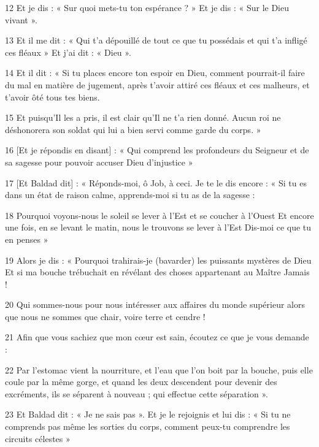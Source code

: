 \par 12 Et je dis : « Sur quoi mets-tu ton espérance ? » Et je dis : « Sur le Dieu vivant ».

\par 13 Et il me dit : « Qui t'a dépouillé de tout ce que tu possédais et qui t'a infligé ces fléaux » Et j'ai dit : « Dieu ».

\par 14 Et il dit : « Si tu places encore ton espoir en Dieu, comment pourrait-il faire du mal en matière de jugement, après t'avoir attiré ces fléaux et ces malheurs, et t'avoir ôté tous tes biens.

\par 15 Et puisqu'Il les a pris, il est clair qu'Il ne t'a rien donné. Aucun roi ne déshonorera son soldat qui lui a bien servi comme garde du corps. »

\par 16 [Et je répondis en disant] : « Qui comprend les profondeurs du Seigneur et de sa sagesse pour pouvoir accuser Dieu d'injustice »

\par 17 [Et Baldad dit] : « Réponds-moi, ô Job, à ceci. Je te le dis encore : « Si tu es dans un état de raison calme, apprends-moi si tu as de la sagesse :

\par 18 Pourquoi voyons-nous le soleil se lever à l'Est et se coucher à l'Ouest Et encore une fois, en se levant le matin, nous le trouvons se lever à l'Est Dis-moi ce que tu en penses »

\par 19 Alors je dis : « Pourquoi trahirais-je (bavarder) les puissants mystères de Dieu Et si ma bouche trébuchait en révélant des choses appartenant au Maître Jamais !

\par 20 Qui sommes-nous pour nous intéresser aux affaires du monde supérieur alors que nous ne sommes que chair, voire terre et cendre !

\par 21 Afin que vous sachiez que mon cœur est sain, écoutez ce que je vous demande :

\par 22 Par l'estomac vient la nourriture, et l'eau que l'on boit par la bouche, puis elle coule par la même gorge, et quand les deux descendent pour devenir des excréments, ils se séparent à nouveau ; qui effectue cette séparation ».

\par 23 Et Baldad dit : « Je ne sais pas ». Et je le rejoignis et lui dis : « Si tu ne comprends pas même les sorties du corps, comment peux-tu comprendre les circuits célestes »

